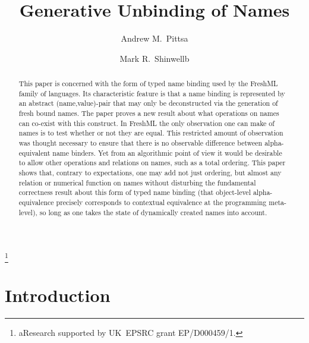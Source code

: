 \documentclass{LMCS}
\theoremstyle{plain}
\theoremstyle{definition}
\begin{document}
\title[Generative Unbinding of Names]{Generative Unbinding of
Names\rsuper *}

\author[A.M.~ Pitts]{Andrew M.~Pitts\rsuper a}	\address{{\lsuper a}University of Cambridge Computer Laboratory\\
Cambridge CB3 0FD, UK}	  \thanks{{\lsuper a}Research supported by UK~EPSRC grant EP/D000459/1.}	

\author[M.R.~Shinwell]{Mark R.~Shinwell\rsuper b}	\address{{\lsuper b}CodeSourcery, Ltd}	  









\begin{abstract}
  \noindent This paper is concerned with the form of typed name
  binding used by the FreshML family of languages. Its characteristic
  feature is that a name binding is represented by an abstract
  (name,value)-pair that may only be deconstructed via the generation
  of fresh bound names.  The paper proves a new result about what
  operations on names can co-exist with this construct.  In FreshML
  the only observation one can make of names is to test whether or not
  they are equal.  This restricted amount of observation was thought
  necessary to ensure that there is no observable difference between
  alpha-equivalent name binders.  Yet from an algorithmic point of
  view it would be desirable to allow other operations and relations
  on names, such as a total ordering.  This paper shows that, contrary
  to expectations, one may add not just ordering, but almost any
  relation or numerical function on names without disturbing the
  fundamental correctness result about this form of typed name binding
  (that object-level alpha-equivalence precisely corresponds to
  contextual equivalence at the programming meta-level), so long as
  one takes the state of dynamically created names into account.
\end{abstract}

\maketitle

\section{Introduction}
\end{document}
